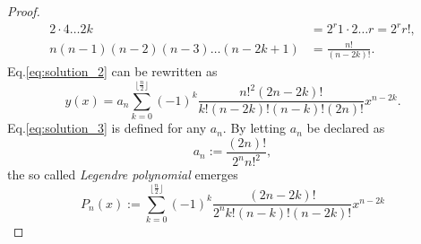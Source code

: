 \begin{proof}
\begin{align}
    2 \cdot 4  \hdots 2k &= 2^r 1\cdot2 \hdots r = 2^r r!\label{eq:2_sub_recursion}, \\
    n(n-1)(n-2)(n-3) \hdots (n-2k+1) &= \frac{n!}{(n-2k)!}\label{eq:3_sub_recursion}.
    \end{align}
    Eq.\eqref{eq:solution_2} can be rewritten as
    \begin{equation}\label{eq:solution_3}
    y(x)=a_n \sum_{k=0}^{\lfloor \frac{n}{2} \rfloor} (-1)^k \frac{n!^2(2n-2k)!}{k!(n-2k)!(n-k)!(2n)!}  x^{n-2k}.
    \end{equation}
    Eq.\eqref{eq:solution_3} is defined for any $a_n$. By letting $a_n$ be declared as
    \begin{equation*}
    a_{n} := \frac{(2n)!}{2^n n!^2},
    \end{equation*}
    the so called \emph{Legendre polynomial} emerges
    \begin{equation}\label{eq:leg_poly}
    P_n(x):=\sum_{k=0}^{\lfloor \frac{n}{2} \rfloor} (-1)^k \frac{(2n-2k)!}{2^n k! (n-k)!(n-2k)!} x^{n-2k} 
    \end{equation}
\end{proof}


